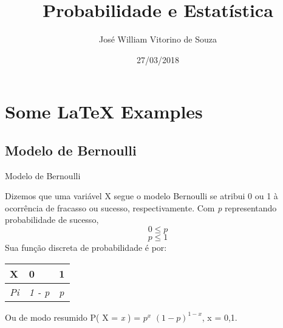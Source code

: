 \documentclass{beamer}
\title[Your Short Title]{Probabilidade e Estatística}
\author{José William Vitorino de Souza}
\institute{IFCE - Aracati}
\date{27/03/2018}
\begin{document}
\begin{frame}
  \titlepage
\end{frame}


\section{Some \LaTeX{} Examples}

\subsection{Modelo de Bernoulli}

\begin{frame}{Modelo de Bernoulli}

Dizemos que uma variável X segue o modelo Bernoulli se atribui 0 ou 1 à ocorrência de fracasso ou sucesso, respectivamente. Com \textit{p} representando probabilidade de sucesso, \[ 0 \leq \textit{p} \] \[ \textit{p} \leq 1 \] Sua função discreta de probabilidade é por:

\begin{table}[]
\centering
\label{my-label}
\begin{tabular}{l|ll}
X & 0 & 1 \\ \hline
\textit{Pi} & \textit{1 - p} & \textit{p}
\end{tabular}
\end{table}

Ou de modo resumido P( X = \textit{x} ) = \( p^x \) \( (1 - p)^{1-x} \), x = 0,1.

\end{frame}
\end{document}

